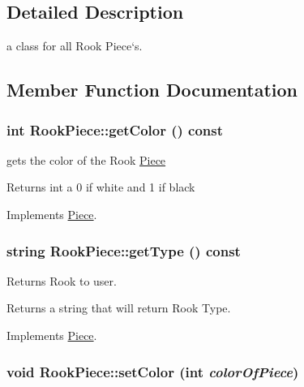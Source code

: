 \subsection{Detailed Description}
a class for all Rook Piece`s. 

\subsection{Member Function Documentation}
\hypertarget{classRookPiece_a15b00afd7fe0fe1035c64b884870c6e1}{
\subsubsection[{getColor}]{\setlength{\rightskip}{0pt plus 5cm}int RookPiece::getColor () const}}
\label{classRookPiece_a15b00afd7fe0fe1035c64b884870c6e1}


gets the color of the Rook \hyperlink{classPiece}{Piece} \begin{DoxyReturn}{Returns}
int a 0 if white and 1 if black 
\end{DoxyReturn}


Implements \hyperlink{classPiece_a1376072d4815719e60253ce5688df95c}{Piece}.\hypertarget{classRookPiece_a45d8858e75e550b72d27d49da0230c0a}{
\subsubsection[{getType}]{\setlength{\rightskip}{0pt plus 5cm}string RookPiece::getType () const}}
\label{classRookPiece_a45d8858e75e550b72d27d49da0230c0a}


Returns Rook to user. \begin{DoxyReturn}{Returns}
a string that will return Rook Type. 
\end{DoxyReturn}


Implements \hyperlink{classPiece_a5b88fcd786bb30b345b24fbc3ab24ab9}{Piece}.\hypertarget{classRookPiece_ad10584bf27bf3f6f109074b878ef840d}{
\subsubsection[{setColor}]{\setlength{\rightskip}{0pt plus 5cm}void RookPiece::setColor (int {\em colorOfPiece})}}
\label{classRookPiece_ad10584bf27bf3f6f109074b878ef840d}


